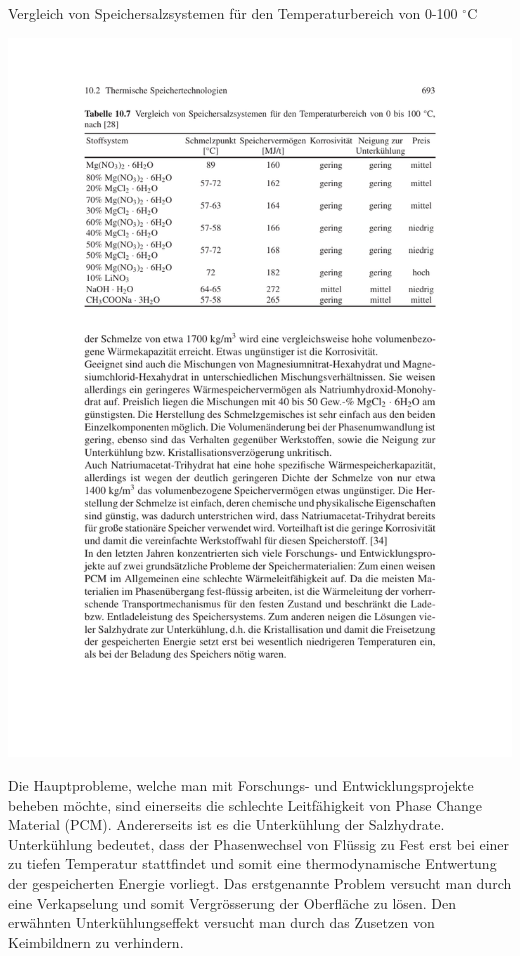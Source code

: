 \documentclass[11pt,a4paper]{scrartcl}
\begin{document}
\begin{table}[h!]
\begin{center}
\caption{Vergleich von Speichersalzsystemen für den Temperaturbereich von 0-100
$^\circ$C \cite{Wesselak}}
\includegraphics[scale=1]{images/speichersalze.pdf}
\label{tab:salz}
\end{center}
\end{table}
Die Hauptprobleme, welche man mit Forschungs- und Entwicklungsprojekte beheben
möchte, sind einerseits die schlechte Leitfähigkeit von Phase Change Material
(PCM). Andererseits ist es die Unterkühlung der Salzhydrate. Unterkühlung
bedeutet, dass der Phasenwechsel von Flüssig zu Fest erst bei einer zu tiefen
Temperatur stattfindet und somit eine thermodynamische Entwertung der
gespeicherten Energie vorliegt. Das erstgenannte Problem versucht man durch eine
Verkapselung und somit Vergrösserung der Oberfläche zu lösen. Den erwähnten
Unterkühlungseffekt versucht man durch das Zusetzen von Keimbildnern zu
verhindern.
\end{document}
